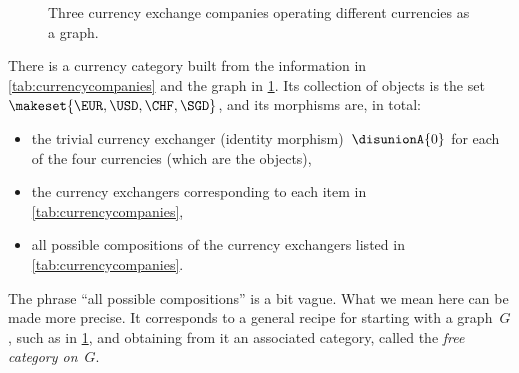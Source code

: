 \begin{figure}[h]
    \centering
    \caption{Three currency exchange companies operating different currencies as a graph. }
    \label{fig:currencygraph}
\end{figure}

There is a currency category built from the information in \cref{tab:currencycompanies} and the graph in \cref{fig:currencygraph}.
Its collection of objects is the set~$\makeset{\EUR, \USD, \CHF, \SGD}$, and its morphisms are, in total:
\begin{itemize}
    \item the trivial currency exchanger (identity morphism)~$\disunionA{0}$ for each of the four currencies (which are the objects),
    \item the currency exchangers corresponding to each item in \cref{tab:currencycompanies},
    \item all possible compositions of the currency exchangers listed in \cref{tab:currencycompanies}.
\end{itemize}

The phrase ``all possible compositions'' is a bit vague.
What we mean here can be made more precise.
It corresponds to a general recipe for starting with a graph~$G$, such as in \cref{fig:currencygraph}, and obtaining from it an associated category, called the \emph{free category on}~$G$.


